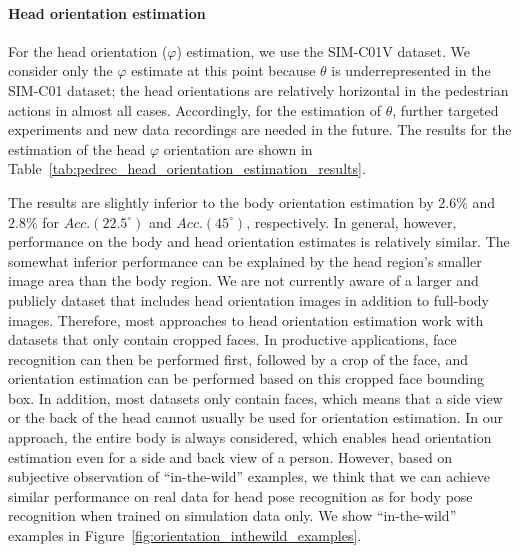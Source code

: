 \documentclass[a4paper, 10pt, conference]{ieeeconf}
\begin{document}
\paragraph{Head orientation estimation}
For the head orientation ($\varphi$) estimation, we use the SIM-C01V dataset. We consider only the $\varphi$ estimate at this point because $\theta$ is underrepresented in the SIM-C01 dataset; the head orientations are relatively horizontal in the pedestrian actions in almost all cases. Accordingly, for the estimation of $\theta$, further targeted experiments and new data recordings are needed in the future. The results for the estimation of the head $\varphi$ orientation are shown in Table~\ref{tab:pedrec_head_orientation_estimation_results}.

\begin{table}[!htbp]
  \centering
  \caption[PedRecNet: Head orientation results]{PedRecNet: Head orientation test results for $\varphi$.}
  \label{tab:pedrec_head_orientation_estimation_results}
\end{table}

The results are slightly inferior to the body orientation estimation by $2.6\%$ and $2.8\%$ for $Acc. (22.5^\circ)$ and $Acc. (45^\circ)$, respectively. In general, however, performance on the body and head orientation estimates is relatively similar. The somewhat inferior performance can be explained by the head region's smaller image area than the body region. 
We are not currently aware of a larger and publicly dataset that includes head orientation images in addition to full-body images. Therefore, most approaches to head orientation estimation work with datasets that only contain cropped faces. In productive applications, face recognition can then be performed first, followed by a crop of the face, and orientation estimation can be performed based on this cropped face bounding box. In addition, most datasets only contain faces, which means that a side view or the back of the head cannot usually be used for orientation estimation. In our approach, the entire body is always considered, which enables head orientation estimation even for a side and back view of a person. However, based on subjective observation of \enquote{in-the-wild} examples, we think that we can achieve similar performance on real data for head pose recognition as for body pose recognition when trained on simulation data only. We show \enquote{in-the-wild} examples in Figure~\ref{fig:orientation_inthewild_examples}.
\end{document}
